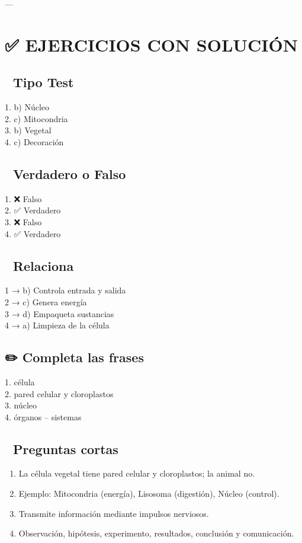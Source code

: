 \documentclass[a4paper,12pt]{article}
\begin{document}
---

\section*{✅ EJERCICIOS CON SOLUCIÓN}

\subsection*{🧩 Tipo Test}
1. b) Núcleo \\
2. c) Mitocondria \\
3. b) Vegetal \\
4. c) Decoración \\

\subsection*{🧠 Verdadero o Falso}
1. ❌ Falso \\
2. ✅ Verdadero \\
3. ❌ Falso \\
4. ✅ Verdadero \\

\subsection*{🔗 Relaciona}
1 → b) Controla entrada y salida \\
2 → c) Genera energía \\
3 → d) Empaqueta sustancias \\
4 → a) Limpieza de la célula \\

\subsection*{✏️ Completa las frases}
1. célula \\
2. pared celular y cloroplastos \\
3. núcleo \\
4. órganos – sistemas \\

\subsection*{💬 Preguntas cortas}
\begin{enumerate}[label=\arabic*)]
    \item La célula vegetal tiene pared celular y cloroplastos; la animal no.
    \item Ejemplo: Mitocondria (energía), Lisosoma (digestión), Núcleo (control).
    \item Transmite información mediante impulsos nerviosos.
    \item Observación, hipótesis, experimento, resultados, conclusión y comunicación.
\end{enumerate}
\end{document}

